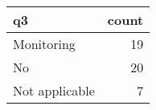 \begin{tabular}{lr}
\toprule
             q3 &  count \\
\midrule
     Monitoring &     19 \\
             No &     20 \\
 Not applicable &      7 \\
\bottomrule
\end{tabular}
